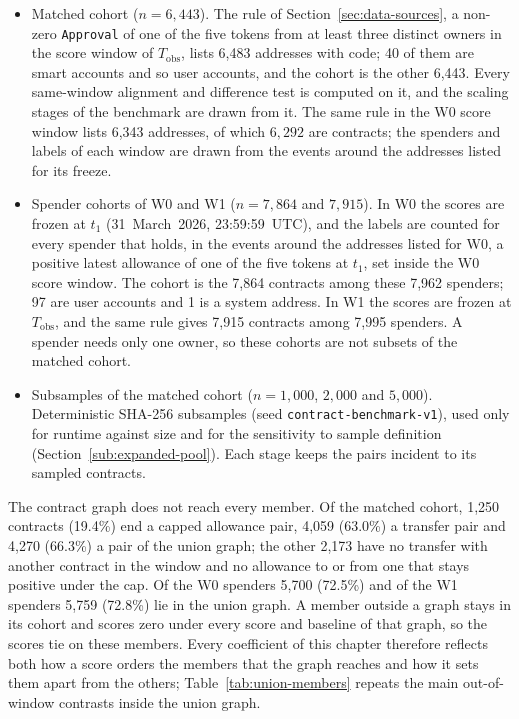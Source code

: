 \begin{itemize}
\item Matched cohort ($n=6{,}443$). The rule of Section~\ref{sec:data-sources}, a non-zero \texttt{Approval} of one of the five tokens from at least three distinct owners in the score window of $T_{\mathrm{obs}}$, lists 6,483 addresses with code; 40 of them are smart accounts and so user accounts, and the cohort is the other 6,443. Every same-window alignment and difference test is computed on it, and the scaling stages of the benchmark are drawn from it. The same rule in the W0 score window lists 6,343 addresses, of which $6{,}292$ are contracts; the spenders and labels of each window are drawn from the events around the addresses listed for its freeze.
\item Spender cohorts of W0 and W1 ($n=7{,}864$ and $7{,}915$). In W0 the scores are frozen at $t_1$ (31~March~2026, 23:59:59~UTC), and the labels are counted for every spender that holds, in the events around the addresses listed for W0, a positive latest allowance of one of the five tokens at $t_1$, set inside the W0 score window. The cohort is the 7,864 contracts among these 7,962 spenders; 97 are user accounts and 1 is a system address. In W1 the scores are frozen at $T_{\mathrm{obs}}$, and the same rule gives 7,915 contracts among 7,995 spenders. A spender needs only one owner, so these cohorts are not subsets of the matched cohort.
\item Subsamples of the matched cohort ($n=1{,}000$, $2{,}000$ and $5{,}000$). Deterministic SHA-256 subsamples (seed \texttt{contract-benchmark-v1}), used only for runtime against size and for the sensitivity to sample definition (Section~\ref{sub:expanded-pool}). Each stage keeps the pairs incident to its sampled contracts.
\end{itemize}



The contract graph does not reach every member. Of the matched cohort, 1,250 contracts (19.4\%) end a capped allowance pair, 4,059 (63.0\%) a transfer pair and 4,270 (66.3\%) a pair of the union graph; the other 2,173 have no transfer with another contract in the window and no allowance to or from one that stays positive under the cap. Of the W0 spenders 5,700 (72.5\%) and of the W1 spenders 5,759 (72.8\%) lie in the union graph. A member outside a graph stays in its cohort and scores zero under every score and baseline of that graph, so the scores tie on these members. Every coefficient of this chapter therefore reflects both how a score orders the members that the graph reaches and how it sets them apart from the others; Table~\ref{tab:union-members} repeats the main out-of-window contrasts inside the union graph.

